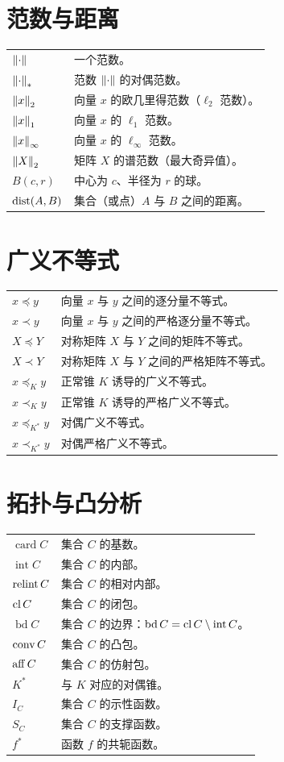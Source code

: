 \section*{范数与距离}
\begin{longtable}{@{}p{}p{}@{}}
$\left\lVert \cdot\right\rVert$ & 一个范数。\\
$\left\lVert \cdot\right\rVert_*$ & 范数 $\left\lVert \cdot\right\rVert$ 的对偶范数。\\
$\left\lVert x\right\rVert_2$ & 向量 $x$ 的欧几里得范数（$\ell_2$ 范数）。\\
$\left\lVert x\right\rVert_1$ & 向量 $x$ 的 $\ell_1$ 范数。\\
$\left\lVert x\right\rVert_\infty$ & 向量 $x$ 的 $\ell_\infty$ 范数。\\
$\left\lVert X\right\rVert_2$ & 矩阵 $X$ 的谱范数（最大奇异值）。\\
$B(c,r)$ & 中心为 $c$、半径为 $r$ 的球。\\
$\operatorname{dist}(A,B)$ & 集合（或点）$A$ 与 $B$ 之间的距离。
\end{longtable}

\section*{广义不等式}
\begin{longtable}{@{}p{}p{}@{}}
$x\preceq y$ & 向量 $x$ 与 $y$ 之间的逐分量不等式。\\
$x\prec y$ & 向量 $x$ 与 $y$ 之间的严格逐分量不等式。\\
$X\preceq Y$ & 对称矩阵 $X$ 与 $Y$ 之间的矩阵不等式。\\
$X\prec Y$ & 对称矩阵 $X$ 与 $Y$ 之间的严格矩阵不等式。\\
$x\preceq_K y$ & 正常锥 $K$ 诱导的广义不等式。\\
$x\prec_K y$ & 正常锥 $K$ 诱导的严格广义不等式。\\
$x\preceq_{K^*}y$ & 对偶广义不等式。\\
$x\prec_{K^*}y$ & 对偶严格广义不等式。
\end{longtable}

\section*{拓扑与凸分析}
\begin{longtable}{@{}p{}p{}@{}}
$\operatorname{card}C$ & 集合 $C$ 的基数。\\
$\operatorname{int}C$ & 集合 $C$ 的内部。\\
$\operatorname{relint} C$ & 集合 $C$ 的相对内部。\\
$\operatorname{cl} C$ & 集合 $C$ 的闭包。\\
$\operatorname{bd}C$ & 集合 $C$ 的边界：$\operatorname{bd}C=\operatorname{cl} C\setminus\operatorname{int}C$。\\
$\operatorname{conv} C$ & 集合 $C$ 的凸包。\\
$\operatorname{aff} C$ & 集合 $C$ 的仿射包。\\
$K^*$ & 与 $K$ 对应的对偶锥。\\
$I_C$ & 集合 $C$ 的示性函数。\\
$S_C$ & 集合 $C$ 的支撑函数。\\
$f^*$ & 函数 $f$ 的共轭函数。
\end{longtable}

